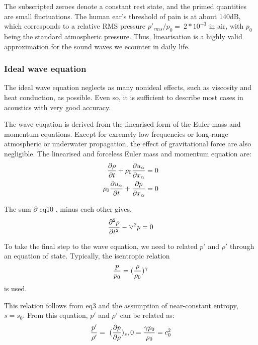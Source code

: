 \documentclass{Note}
\begin{document}
The subscripted zeroes denote a constant rest state, and the primed quantities are small fluctuations. The human ear's threshold of pain is at about 140dB, which corresponds to a relative RMS pressure $p'_{rms}/p_0=~2*10^{-3}$ in air, with $p_0$ being the standard atmospheric pressure. Thus, linearisation is a highly valid approximation for the sound waves we ecounter in daily life.

\subsubsection{Ideal wave equation}
The ideal wave equation neglects as many nonideal effects, such as viscosity and heat conduction, as possible. Even so, it is sufficient to describe most cases in acoustics with very good accuracy.

The wave euqation is derived from the linearised form of the Euler mass and momentum equations. Except for exremely low frequencies or long-range atmospheric or underwater propagation, the effect of gravitational force are also negligible. The linearised and forceless Euler mass and momentum equation are:
\begin{equation}
\begin{aligned}
{\partial\rho\over \partial t}+\rho_0{\partial u_\alpha \over \partial x_\alpha}=0\\
\rho_0{\partial u_\alpha\over \partial t}+{\partial p\over \partial x_\alpha}=0
\end{aligned}
\end{equation}

The sum $\partial $ eq10 , minus each other gives,
\begin{equation}
\begin{aligned}
{\partial^2\rho\over \partial t^2}-\triangledown^2 p=0
\end{aligned}
\end{equation}

To take the final step to the wave equation, we need to related $p'$ and $\rho'$ through an equation of state. Typically, the isentropic relation
\begin{equation}
\begin{aligned}
{p\over p_0}=({\rho\over \rho_0})^\gamma
\end{aligned}
\end{equation}
is used.

This relation follows from eq3 and the assumption of near-constant entropy, $s=s_0$. From this equation, $p'$ and $\rho'$ can be related as:
\begin{equation}
\begin{aligned}
{p'\over \rho'}=~({\partial p\over \partial \rho})_s,0={\gamma p_0 \over \rho_0}=c_0^2
\end{aligned}
\end{equation}
\end{document}
